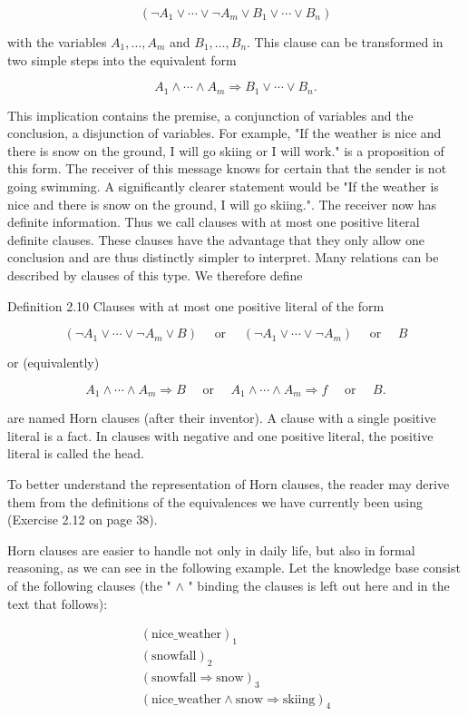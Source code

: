 \documentclass[10pt]{book}
\begin{document}
$$
\left(\neg A_{1} \vee \cdots \vee \neg A_{m} \vee B_{1} \vee \cdots \vee B_{n}\right)
$$

with the variables $A_{1}, \ldots, A_{m}$ and $B_{1}, \ldots, B_{n}$. This clause can be transformed in two simple steps into the equivalent form

$$
A_{1} \wedge \cdots \wedge A_{m} \Rightarrow B_{1} \vee \cdots \vee B_{n} .
$$

This implication contains the premise, a conjunction of variables and the conclusion, a disjunction of variables. For example, "If the weather is nice and there is snow on the ground, I will go skiing or I will work." is a proposition of this form. The receiver of this message knows for certain that the sender is not going swimming. A significantly clearer statement would be "If the weather is nice and there is snow on the ground, I will go skiing.". The receiver now has definite information. Thus we call clauses with at most one positive literal definite clauses. These clauses have the advantage that they only allow one conclusion and are thus distinctly simpler to interpret. Many relations can be described by clauses of this type. We therefore define

Definition 2.10 Clauses with at most one positive literal of the form

$$
\left(\neg A_{1} \vee \cdots \vee \neg A_{m} \vee B\right) \quad \text { or } \quad\left(\neg A_{1} \vee \cdots \vee \neg A_{m}\right) \quad \text { or } \quad B
$$

or (equivalently)

$$
A_{1} \wedge \cdots \wedge A_{m} \Rightarrow B \quad \text { or } \quad A_{1} \wedge \cdots \wedge A_{m} \Rightarrow f \quad \text { or } \quad B .
$$

are named Horn clauses (after their inventor). A clause with a single positive literal is a fact. In clauses with negative and one positive literal, the positive literal is called the head.

To better understand the representation of Horn clauses, the reader may derive them from the definitions of the equivalences we have currently been using (Exercise 2.12 on page 38).

Horn clauses are easier to handle not only in daily life, but also in formal reasoning, as we can see in the following example. Let the knowledge base consist of the following clauses (the " $\wedge$ " binding the clauses is left out here and in the text that follows):

\[
\begin{array}{l}
(\text{nice\_weather})_{1}\\
(\text{snowfall})_{2}\\
(\text{snowfall} \Rightarrow \text{snow})_{3}\\
(\text{nice\_weather} \wedge \text{snow} \Rightarrow \text{skiing})_{4}
\end{array}
\]
\end{document}
